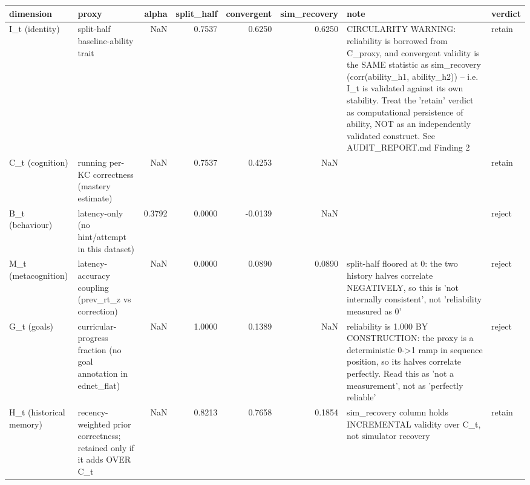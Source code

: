 \begin{tabular}{llrrrrll}
\toprule
dimension & proxy & alpha & split\_half & convergent & sim\_recovery & note & verdict \\
\midrule
I\_t (identity) & split-half baseline-ability trait & NaN & 0.7537 & 0.6250 & 0.6250 & CIRCULARITY WARNING: reliability is borrowed from C\_proxy, and convergent validity is the SAME statistic as sim\_recovery (corr(ability\_h1, ability\_h2)) -- i.e. I\_t is validated against its own stability. Treat the 'retain' verdict as computational persistence of ability, NOT as an independently validated construct. See AUDIT\_REPORT.md Finding 2 & retain \\
C\_t (cognition) & running per-KC correctness (mastery estimate) & NaN & 0.7537 & 0.4253 & NaN &  & retain \\
B\_t (behaviour) & latency-only (no hint/attempt in this dataset) & 0.3792 & 0.0000 & -0.0139 & NaN &  & reject \\
M\_t (metacognition) & latency-accuracy coupling (prev\_rt\_z vs correction) & NaN & 0.0000 & 0.0890 & 0.0890 & split-half floored at 0: the two history halves correlate NEGATIVELY, so this is 'not internally consistent', not 'reliability measured as 0' & reject \\
G\_t (goals) & curricular-progress fraction (no goal annotation in ednet\_flat) & NaN & 1.0000 & 0.1389 & NaN & reliability is 1.000 BY CONSTRUCTION: the proxy is a deterministic 0->1 ramp in sequence position, so its halves correlate perfectly. Read this as 'not a measurement', not as 'perfectly reliable' & reject \\
H\_t (historical memory) & recency-weighted prior correctness; retained only if it adds OVER C\_t & NaN & 0.8213 & 0.7658 & 0.1854 & sim\_recovery column holds INCREMENTAL validity over C\_t, not simulator recovery & retain \\
\bottomrule
\end{tabular}
